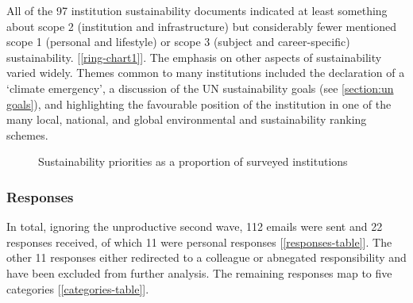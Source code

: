 All of the 97 institution sustainability documents indicated at least something about scope 2 (institution and infrastructure) but considerably fewer mentioned scope 1 (personal and lifestyle) or scope 3 (subject and career-specific) sustainability. [\autoref{ring-chart1}]. The emphasis on other aspects of sustainability varied widely. Themes common to many institutions included the declaration of a `climate emergency', a discussion of the UN sustainability goals (see \autoref{section:un goals}), and highlighting the favourable position of the institution in one of the many local, national, and global environmental and sustainability ranking schemes.

\begin{figure}
\newcommand{\coloursector}[5]{%
  \fill[#5] (#1:#3) arc[start angle=#1, end angle=#2, radius=#3] -- (#2:#4) arc[start angle=#2, end angle=#1, radius=#4] -- cycle;
}
\caption{\label{ring-chart1}Sustainability priorities as a proportion of surveyed institutions}
\end{figure}

\subsubsection*{Responses}

In total, ignoring the unproductive second wave, 112 emails were sent and 22 responses received, of which 11 were personal responses [\autoref{responses-table}]. The other 11 responses either redirected to a colleague or abnegated responsibility and have been excluded from further analysis. The remaining responses map to five categories [\autoref{categories-table}].

